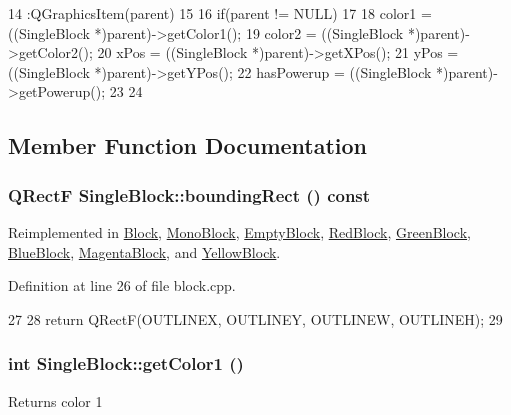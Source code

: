 \begin{DoxyCode}
14         :QGraphicsItem(parent)
15 {
16     if(parent != NULL)
17     {
18         color1 = ((SingleBlock *)parent)->getColor1();
19         color2 = ((SingleBlock *)parent)->getColor2();
20         xPos = ((SingleBlock *)parent)->getXPos();
21         yPos = ((SingleBlock *)parent)->getYPos();
22         hasPowerup = ((SingleBlock *)parent)->getPowerup();
23     }
24 }
\end{DoxyCode}


\subsection{Member Function Documentation}
\hypertarget{class_single_block_a96b8d4a017cce8eaf08a09632e7f9907}{
\subsubsection[{boundingRect}]{\setlength{\rightskip}{0pt plus 5cm}QRectF SingleBlock::boundingRect () const}}
\label{class_single_block_a96b8d4a017cce8eaf08a09632e7f9907}


Reimplemented in \hyperlink{class_block_aee4444b92a82f5a8080e9019ef1e554d}{Block}, \hyperlink{class_mono_block_ae85adc70af0318603a03c2daf768c145}{MonoBlock}, \hyperlink{class_empty_block_a1984fabb510aba7e14f460845faf881c}{EmptyBlock}, \hyperlink{class_red_block_a31036897a1451c6140ce9f368e461fb0}{RedBlock}, \hyperlink{class_green_block_a302d2bfd76e7f40196c699ae52607175}{GreenBlock}, \hyperlink{class_blue_block_ae83a63d0611bc918f93d7019b4b27056}{BlueBlock}, \hyperlink{class_magenta_block_aec892d6118a5a5030d767a5ccfc56929}{MagentaBlock}, and \hyperlink{class_yellow_block_a05f341c5d1b859d8c7b909a5cfee7601}{YellowBlock}.

Definition at line 26 of file block.cpp.


\begin{DoxyCode}
27 {
28     return QRectF(OUTLINEX, OUTLINEY, OUTLINEW, OUTLINEH);
29 }
\end{DoxyCode}
\hypertarget{class_single_block_aa46aacef2ede822289499a2a41f00054}{
\subsubsection[{getColor1}]{\setlength{\rightskip}{0pt plus 5cm}int SingleBlock::getColor1 ()}}
\label{class_single_block_aa46aacef2ede822289499a2a41f00054}
Returns color 1 

